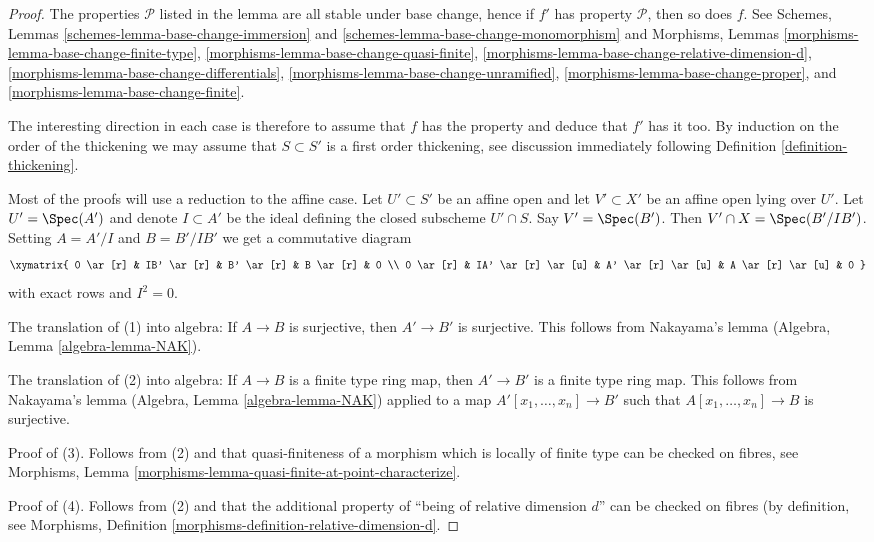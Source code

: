 \begin{proof}
The properties $\mathcal{P}$ listed in the lemma are all stable
under base change, hence if $f'$ has property $\mathcal{P}$, then so
does $f$. See
Schemes, Lemmas \ref{schemes-lemma-base-change-immersion} and
\ref{schemes-lemma-base-change-monomorphism}
and
Morphisms, Lemmas
\ref{morphisms-lemma-base-change-finite-type},
\ref{morphisms-lemma-base-change-quasi-finite},
\ref{morphisms-lemma-base-change-relative-dimension-d},
\ref{morphisms-lemma-base-change-differentials},
\ref{morphisms-lemma-base-change-unramified},
\ref{morphisms-lemma-base-change-proper}, and
\ref{morphisms-lemma-base-change-finite}.

\medskip\noindent
The interesting direction in each case is therefore to assume
that $f$ has the property and deduce that $f'$ has it too.
By induction on the order of the thickening we may
assume that $S \subset S'$ is a first order thickening, see
discussion immediately following
Definition \ref{definition-thickening}.

\medskip\noindent
Most of the proofs will use a reduction to the affine case. Let
$U' \subset S'$ be an affine open and let $V' \subset X'$ be an affine open
lying over $U'$. Let $U' = \Spec(A')$ and denote $I \subset A'$ be the ideal
defining the closed subscheme $U' \cap S$. Say $V' = \Spec(B')$.
Then $V' \cap X = \Spec(B'/IB')$. Setting $A = A'/I$ and
$B = B'/IB'$ we get a commutative diagram
$$
\xymatrix{
0 \ar[r] &
IB' \ar[r] &
B' \ar[r] &
B \ar[r] & 0 \\
0 \ar[r] &
IA' \ar[r] \ar[u] &
A' \ar[r] \ar[u] &
A \ar[r] \ar[u] & 0
}
$$
with exact rows and $I^2 = 0$.

\medskip\noindent
The translation of (1) into algebra: If $A \to B$ is surjective,
then $A' \to B'$ is surjective. This follows from
Nakayama's lemma (Algebra, Lemma \ref{algebra-lemma-NAK}).

\medskip\noindent
The translation of (2) into algebra: If $A \to B$ is a finite type ring
map, then $A' \to B'$ is a finite type ring map. This follows from
Nakayama's lemma (Algebra, Lemma \ref{algebra-lemma-NAK})
applied to a map $A'[x_1, \ldots, x_n] \to B'$ such that
$A[x_1, \ldots, x_n] \to B$ is surjective.

\medskip\noindent
Proof of (3).  Follows from (2) and that quasi-finiteness of a morphism
which is locally of finite type can be checked on fibres, see
Morphisms, Lemma \ref{morphisms-lemma-quasi-finite-at-point-characterize}.

\medskip\noindent
Proof of (4). Follows from (2) and that the additional property of ``being of
relative dimension $d$'' can be checked on fibres (by definition, see
Morphisms, Definition \ref{morphisms-definition-relative-dimension-d}.


\end{proof}
